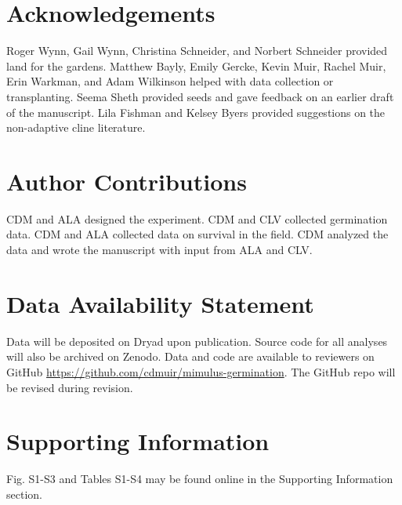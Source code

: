 \documentclass[
  12pt,
]{article}
\begin{document}
\hypertarget{acknowledgements}{%
\section{Acknowledgements}\label{acknowledgements}}

Roger Wynn, Gail Wynn, Christina Schneider, and Norbert Schneider provided land for the gardens. Matthew Bayly, Emily Gercke, Kevin Muir, Rachel Muir, Erin Warkman, and Adam Wilkinson helped with data collection or transplanting. Seema Sheth provided seeds and gave feedback on an earlier draft of the manuscript. Lila Fishman and Kelsey Byers provided suggestions on the non-adaptive cline literature.

\hypertarget{author-contributions}{%
\section{Author Contributions}\label{author-contributions}}

CDM and ALA designed the experiment. CDM and CLV collected germination data. CDM and ALA collected data on survival in the field. CDM analyzed the data and wrote the manuscript with input from ALA and CLV.

\hypertarget{data-availability-statement}{%
\section{Data Availability Statement}\label{data-availability-statement}}

Data will be deposited on Dryad upon publication. Source code for all analyses will also be archived on Zenodo. Data and code are available to reviewers on GitHub \url{https://github.com/cdmuir/mimulus-germination}. The GitHub repo will be revised during revision.

\hypertarget{supporting-information}{%
\section{Supporting Information}\label{supporting-information}}

Fig. S1-S3 and Tables S1-S4 may be found online in the Supporting Information section.

\renewcommand\thefigure{S\arabic{figure}}    
\renewcommand\thetable{S\arabic{table}}    
\setcounter{figure}{0}    
\setcounter{table}{0}

\begin{figure}[ht]
  \captionsetup{labelformat=empty}
  \caption{}
  \label{fig:range-map}
\end{figure}
\end{document}
